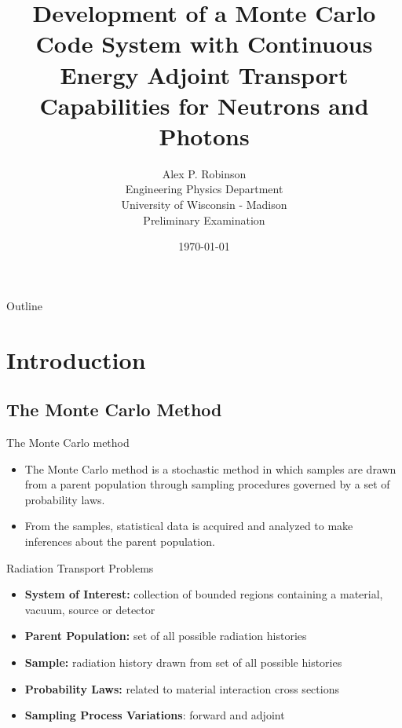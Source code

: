 \documentclass{beamer}
\author{Alex P. Robinson
    \\ Engineering Physics Department
    \\ University of Wisconsin - Madison
    \\ Preliminary Examination
}
\date{\today}
\title{Development of a Monte Carlo Code System with Continuous Energy Adjoint Transport Capabilities for Neutrons and Photons}
\begin{document}
\maketitle
\begin{frame}{Outline}

  \tableofcontents

\end{frame}

\section{Introduction}
\subsection{The Monte Carlo Method}
\begin{frame}{The Monte Carlo method}

  \begin{itemize}
    \item The Monte Carlo method is a stochastic method in which samples are
      drawn from a parent population through sampling procedures governed by
      a set of probability laws.
      \medskip
    \item From the samples, statistical data is acquired and analyzed to make
      inferences about the parent population.
  \end{itemize}
  
  \medskip
  \medskip
  
  \begin{beamerboxesrounded}[upper=boxheadcolor,lower=boxbodycolor,shadow=true]{Radiation Transport Problems}
    \begin{itemize}
      \item \textbf{System of Interest:} collection of bounded regions 
        containing a material, vacuum, source or detector
      \item \textbf{Parent Population:} set of all possible radiation histories
      \item \textbf{Sample:} radiation history drawn from set of all possible 
        histories
      \item \textbf{Probability Laws:} related to material interaction cross 
        sections
      \item \textbf{Sampling Process Variations}: forward and adjoint
    \end{itemize}
  \end{beamerboxesrounded}
    
\end{frame}
\end{document}
